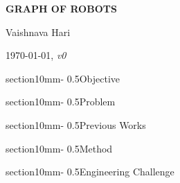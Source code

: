 \documentclass[11pt,a4paper]{article}
\makeatletter
\renewcommand{\section}{\@startsection%
{section}{1}{0mm}{-\baselineskip}%
{0.5\baselineskip}{\normalfont\Large\bfseries}}%
\makeatother
\begin{document}
\pagestyle{plain}

\begin{center} 
\bfseries\uppercase{Graph of Robots}
\end{center}
\vspace{-0.3cm}
\centerline{{Vaishnava Hari}}
\centerline{\today, \textit{v0}}


\section{Objective}
    

\section{Problem}
    

\section{Previous Works}
    

\section{Method}
    

\newpage
\section{Engineering Challenge}
    

%     



\end{document}
